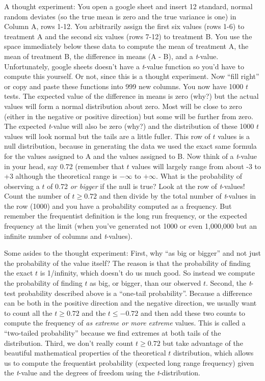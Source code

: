 \documentclass[]{book}
\begin{document}
A thought experiment: You open a google sheet and insert 12 standard,
normal random deviates (so the true mean is zero and the true variance
is one) in Column A, rows 1-12. You arbitrarily assign the first six
values (rows 1-6) to treatment A and the second six values (rows 7-12)
to treatment B. You use the space immediately below these data to
compute the mean of treatment A, the mean of treatment B, the difference
in means (A - B), and a \emph{t}-value. Unfortunately, google sheets
doesn't have a \emph{t}-value function so you'd have to compute this
yourself. Or not, since this is a thought experiment. Now ``fill right''
or copy and paste these functions into 999 new columns. You now have
1000 \(t\) tests. The expected value of the difference in means is zero
(why?) but the actual values will form a normal distribution about zero.
Most will be close to zero (either in the negative or positive
direction) but some will be further from zero. The expected
\emph{t}-value will also be zero (why?) and the distribution of these
1000 \(t\) values will look normal but the tails are a little fuller.
This row of \(t\) values is a null distribution, because in generating
the data we used the exact same formula for the values assigned to A and
the values assigned to B. Now think of a \emph{t}-value in your head,
say 0.72 (remember that \(t\) values will largely range from about -3 to
+3 although the theoretical range is \(-\infty\) to \(+\infty\). What is
the probability of observing a \(t\) of 0.72 \emph{or bigger} if the
null is true? Look at the row of \emph{t}-values! Count the number of
\(t \ge 0.72\) and then divide by the total number of \emph{t}-values in
the row (1000) and you have a probability computed as a frequency. But
remember the frequentist definition is the long run frequency, or the
expected frequency at the limit (when you've generated not 1000 or even
1,000,000 but an infinite number of columns and \emph{t}-values).

Some asides to the thought experiment: First, why ``as big or bigger''
and not just the probability of the value itself? The reason is that the
probability of finding the exact \(t\) is 1/infinity, which doesn't do
us much good. So instead we compute the probability of finding \(t\) as
big, or bigger, than our observed \(t\). Second, the \emph{t}-test
probability described above is a ``one-tail probability''. Because a
difference can be both in the positive direction and the negative
direction, we usually want to count all the \(t \ge 0.72\) and the
\(t \le -0.72\) and then add these two counts to compute the frequency
of \emph{as extreme or more extreme} values. This is called a
``two-tailed probability'' because we find extremes at both tails of the
distribution. Third, we don't really count \(t \ge 0.72\) but take
advantage of the beautiful mathematical properties of the theoretical
\(t\) distribution, which allows us to compute the frequentist
probability (expected long range frequency) given the \emph{t}-value and
the degrees of freedom using the \emph{t}-distribution.
\end{document}
